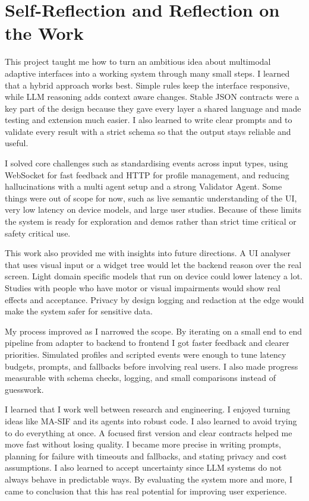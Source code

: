 \section{Self-Reflection and Reflection on the Work}

This project taught me how to turn an ambitious idea about multimodal adaptive interfaces into a working system through many small steps. I learned that a hybrid approach works best. Simple rules keep the interface responsive, while LLM reasoning adds context aware changes. Stable JSON contracts were a key part of the design because they gave every layer a shared language and made testing and extension much easier. I also learned to write clear prompts and to validate every result with a strict schema so that the output stays reliable and useful.

I solved core challenges such as standardising events across input types, using WebSocket for fast feedback and HTTP for profile management, and reducing hallucinations with a multi agent setup and a strong Validator Agent. Some things were out of scope for now, such as live semantic understanding of the UI, very low latency on device models, and large user studies. Because of these limits the system is ready for exploration and demos rather than strict time critical or safety critical use.

This work also provided me with insights into future directions. A UI analyser that uses visual input or a widget tree would let the backend reason over the real screen. Light domain specific models that run on device could lower latency a lot. Studies with people who have motor or visual impairments would show real effects and acceptance. Privacy by design logging and redaction at the edge would make the system safer for sensitive data.

My process improved as I narrowed the scope. By iterating on a small end to end pipeline from adapter to backend to frontend I got faster feedback and clearer priorities. Simulated profiles and scripted events were enough to tune latency budgets, prompts, and fallbacks before involving real users. I also made progress measurable with schema checks, logging, and small comparisons instead of guesswork.

I learned that I work well between research and engineering. I enjoyed turning ideas like MA-SIF and its agents into robust code. I also learned to avoid trying to do everything at once. A focused first version and clear contracts helped me move fast without losing quality. I became more precise in writing prompts, planning for failure with timeouts and fallbacks, and stating privacy and cost assumptions. I also learned to accept uncertainty since LLM systems do not always behave in predictable ways. By evaluating the system more and more, I came to conclusion that this has real potential for improving user experience.

